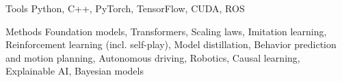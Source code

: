 


\begin{cvskills}


\cvskill
{Tools} %
{Python, C++, PyTorch, TensorFlow, CUDA, ROS} %


\cvskill
{Methods} %
{Foundation models, Transformers, Scaling laws, Imitation learning, Reinforcement learning (incl. self-play), Model distillation, Behavior prediction and motion planning, Autonomous driving, Robotics, Causal learning, Explainable AI, Bayesian models} %



\end{cvskills}
